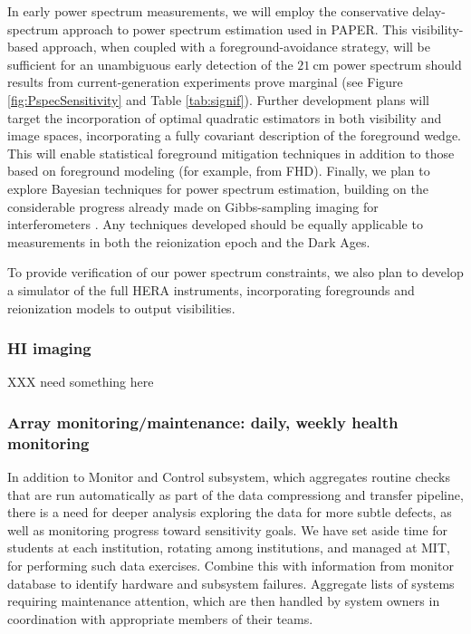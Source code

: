 \documentclass[preprint]{aastex}
\begin{document}
In early power spectrum measurements, we will employ the conservative delay-spectrum approach to power spectrum estimation used in PAPER.  This visibility-based approach, when coupled with a foreground-avoidance strategy, will be sufficient for an unambiguous early detection of the $21~\textrm{cm}$ power spectrum should results from current-generation experiments prove marginal (see Figure \ref{fig:PspecSensitivity} and Table \ref{tab:signif}).  Further development plans will target the incorporation of optimal quadratic estimators in both visibility and image spaces, incorporating a fully covariant description of the foreground wedge.  This will enable statistical foreground mitigation techniques in addition to those based on foreground modeling (for example, from FHD).  Finally, we plan to explore Bayesian techniques for power spectrum estimation, building on the considerable progress already made on Gibbs-sampling imaging for interferometers \cite{sutter_et_al2014}.  Any techniques developed should be equally applicable to measurements in both the reionization epoch and the Dark Ages.

To provide verification of our power spectrum constraints, we also plan to develop a simulator of the full HERA instruments, incorporating foregrounds and reionization models to output visibilities.

\subsubsection{HI imaging}

XXX need something here

\subsubsection{Array monitoring/maintenance: daily, weekly health monitoring}

In addition to Monitor and Control subsystem, which aggregates routine checks that are run automatically as
part of the data compressiong and transfer pipeline, there is a need for deeper analysis
exploring the data for more subtle defects, as well as monitoring progress toward sensitivity goals.
We have set aside time for students at each institution, rotating among institutions, and managed at MIT,
for performing such data exercises.
Combine this with information from monitor database to identify hardware and subsystem failures.
Aggregate lists of systems requiring maintenance attention, which are then handled by system owners
in coordination with appropriate members of their teams.
\end{document}
